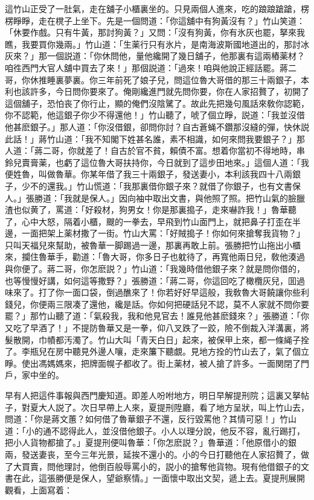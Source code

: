 這竹山正受了一肚氣，走在舖子小櫃裏坐的。只見兩個人進來，吃的踉踉蹌蹌，楞楞睜睜，走在櫈子上坐下。先是一個問道：「你這舖中有狗黃沒有？」竹山笑道：「休要作戲。只有牛黃，那討狗黃？」又問：「沒有狗黃，你有氷灰也罷，拏來我瞧，我要買你幾兩。」竹山道：「生薬行只有氷片，是南海波斯國地道出的，那討冰灰來？」那一個説道：「你休問他，量他纔開了幾日舖子，他那裏有這兩樁薬材？咱徃西門大官人舖中買去了來！」那個説道：「過來！咱與他說正經話罷。蔣二哥，你休推睡裏夢裏。你三年前死了娘子兒，問這位魯大哥借的那三十兩銀子，本利也該許多，今日問你要來了。俺剛纔進門就先問你要，你在人家招贅了，初開了這個舖子，恐怕丧了你行止，顯的俺們沒陰騭了。故此先把幾句風話來敎你認範，你不認範，他這銀子你少不得還他！」竹山聽了，唬了個立睜，説道：「我並沒借他甚麽銀子。」那人道：「你沒借銀，卻問你討？自古蒼蝇不鑽那沒縫的彈，快休説此話！」蔣竹山道：「我不知閣下姓甚名誰，素不相識，如何來問我要銀子？」那人道：「蔣二哥，你就差了！自古於官不貧，賴債不富。想着你當初不得地時，串鈴兒賣膏薬，也虧了這位魯大哥扶持你，今日就到了這步田地來。」這個人道：「我便姓魯，叫做魯華。你某年借了我三十兩銀子，發送妻小，本利該我四十八兩銀子，少不的還我。」竹山慌道：「我那裏借你銀子來？就借了你銀子，也有文書保人。」張勝道：「我就是保人。」因向袖中取出文書，與他照了照。把竹山氣的臉臘渣也似黄了，罵道：「好殺材，狗男女！你是那裏搗子，走來嚇詐我！」魯華聽了，心中大怒，隔着小櫃，颼的一拳去，早飛到竹山面門上，就把鼻子打歪在半邊，一面把架上薬材撒了一街。竹山大罵：「好賊搗子！你如何來搶奪我貨物？」只叫天福兒來幫助，被魯華一脚踢過一邊，那裏再敢上前。張勝把竹山拖出小櫃來，攔住魯華手，勸道：「魯大哥，你多日子也躭待了，再寬他兩日兒，敎他湊過與你便了。蔣二哥，你怎麽説？」竹山道：「我幾時借他銀子來？就是問你借的，也等慢慢好講，如何這等撒野？」張勝道：「蔣二哥，你這回吃了橄欖灰兒，囬過味來了。打了你一面口袋，倒過醮來了！你若好好早這般，我敎魯大哥饒讓你些利錢兒，你便兩三限凑了還他，纔是話。你如何把硬話兒不認，莫不人家就不問你要罷？」那竹山聽了道：「氣殺我，我和他見官去！誰見他甚麽錢來？」張勝道：「你又吃了早酒了！」不提防魯華又是一拳，仰八叉跌了一跤，險不倒裁入洋溝裏，將髮散開，巾幘都汚濁了。竹山大叫「青天白日」起來，被保甲上來，都一條䋲子拴了。李瓶兒在房中聽見外邊人嚷，走來簾下聽覷。見地方拴的竹山去了，氣了個立睜。使出馮媽媽來，把牌面幌子都收了。街上薬材，被人搶了許多。一面関閉了門戶，家中坐的。

早有人把這件事報與西門慶知道。即差人吩咐地方，明日早解提刑院；這裏又拏帖子，對夏大人説了。次日早帶上人來，夏提刑陞廳，看了地方呈狀，叫上竹山去，問道：「你是蔣文蕙？如何借了魯華銀子不還，反行毀罵他？其情可惡！」竹山道：「小的通不認得此人，並沒借他銀子。小人以理分說，他反不容，亂行踢打，把小人貨物都搶了。」夏提刑便叫魯華：「你怎麽説？」魯華道：「他原借小的銀兩，發送妻丧，至今三年光景，延挨不還小的。小的今日打聽他在人家招贅了，做了大買賣，問他理討，他倒百般辱罵小的，説小的搶奪他貨物。現有他借銀子的文書在此，這張勝便是保人，望爺察情。」一面懷中取出文契，遞上去。夏提刑展開觀看，上面寫着：

